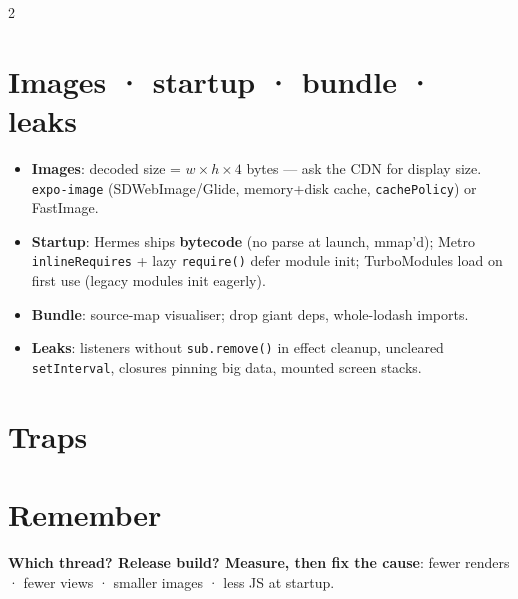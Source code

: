 \documentclass[8pt]{extarticle}
\begin{document}
\begin{multicols}{2}
\section{Images · startup · bundle · leaks}
\begin{itemize}
  \item \textbf{Images}: decoded size = $w \times h \times 4$ bytes — ask the CDN for
        display size. \texttt{expo-image} (SDWebImage/Glide, memory+disk cache,
        \texttt{cachePolicy}) or FastImage.
  \item \textbf{Startup}: Hermes ships \textbf{bytecode} (no parse at launch, mmap'd);
        Metro \texttt{inlineRequires} + lazy \texttt{require()} defer module init;
        TurboModules load on first use (legacy modules init eagerly).
  \item \textbf{Bundle}: source-map visualiser; drop giant deps, whole-lodash imports.
  \item \textbf{Leaks}: listeners without \texttt{sub.remove()} in effect cleanup,
        uncleared \texttt{setInterval}, closures pinning big data, mounted screen stacks.
\end{itemize}

\section{Traps}
\begin{itemize}
\end{itemize}

\section{Remember}
\textbf{Which thread? Release build? Measure, then fix the cause}: fewer renders ·
fewer views · smaller images · less JS at startup.


\end{multicols}

\end{document}

